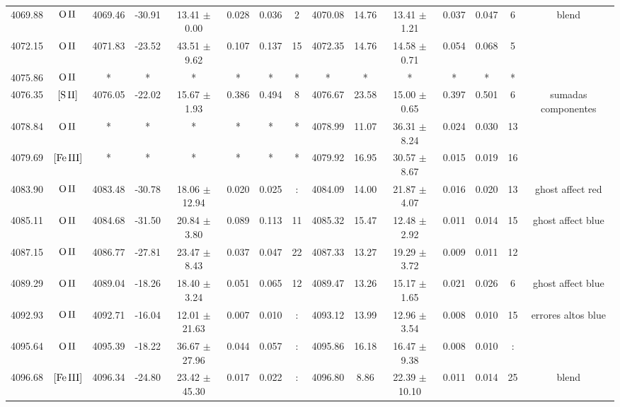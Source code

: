 \documentclass{article}
\begin{document}
\begin{table*}
\begin{adjustbox}{width=\textwidth}
\begin{tabular}{ccccccccccccccc}
4069.88 & $\mbox{O}\thinspace \mbox{II}$ & 4069.46 & -30.91 & 13.41 $\pm$ 0.00 & 0.028 & 0.036 & 2 & 4070.08 & 14.76 & 13.41 $\pm$ 1.21 & 0.037 & 0.047 & 6 &  blend \\
4072.15 & $\mbox{O}\thinspace \mbox{II}$ & 4071.83 & -23.52 & 43.51 $\pm$ 9.62 & 0.107 & 0.137 & 15 & 4072.35 & 14.76 & 14.58 $\pm$ 0.71 & 0.054 & 0.068 & 5 &  \\
4075.86 & $\mbox{O}\thinspace \mbox{II}$ & * & * & * & * & * & * & * & * & * & * & * & * &  \\
4076.35 & $\mbox{[S}\thinspace \mbox{II]}$ & 4076.05 & -22.02 & 15.67 $\pm$ 1.93 & 0.386 & 0.494 & 8 & 4076.67 & 23.58 & 15.00 $\pm$ 0.65 & 0.397 & 0.501 & 6 &  sumadas componentes \\
4078.84 & $\mbox{O}\thinspace \mbox{II}$ & * & * & * & * & * & * & 4078.99 & 11.07 & 36.31 $\pm$ 8.24 & 0.024 & 0.030 & 13 &  \\
4079.69 & $\mbox{[Fe}\thinspace \mbox{III]}$ & * & * & * & * & * & * & 4079.92 & 16.95 & 30.57 $\pm$ 8.67 & 0.015 & 0.019 & 16 &  \\
4083.90 & $\mbox{O}\thinspace \mbox{II}$ & 4083.48 & -30.78 & 18.06 $\pm$ 12.94 & 0.020 & 0.025 & : & 4084.09 & 14.00 & 21.87 $\pm$ 4.07 & 0.016 & 0.020 & 13 &  ghost affect red \\
4085.11 & $\mbox{O}\thinspace \mbox{II}$ & 4084.68 & -31.50 & 20.84 $\pm$ 3.80 & 0.089 & 0.113 & 11 & 4085.32 & 15.47 & 12.48 $\pm$ 2.92 & 0.011 & 0.014 & 15 &  ghost affect blue \\
4087.15 & $\mbox{O}\thinspace \mbox{II}$ & 4086.77 & -27.81 & 23.47 $\pm$ 8.43 & 0.037 & 0.047 & 22 & 4087.33 & 13.27 & 19.29 $\pm$ 3.72 & 0.009 & 0.011 & 12 &  \\
4089.29 & $\mbox{O}\thinspace \mbox{II}$ & 4089.04 & -18.26 & 18.40 $\pm$ 3.24 & 0.051 & 0.065 & 12 & 4089.47 & 13.26 & 15.17 $\pm$ 1.65 & 0.021 & 0.026 & 6 &  ghost affect blue \\
4092.93 & $\mbox{O}\thinspace \mbox{II}$ & 4092.71 & -16.04 & 12.01 $\pm$ 21.63 & 0.007 & 0.010 & : & 4093.12 & 13.99 & 12.96 $\pm$ 3.54 & 0.008 & 0.010 & 15 &  errores altos blue \\
4095.64 & $\mbox{O}\thinspace \mbox{II}$ & 4095.39 & -18.22 & 36.67 $\pm$ 27.96 & 0.044 & 0.057 & : & 4095.86 & 16.18 & 16.47 $\pm$ 9.38 & 0.008 & 0.010 & : &  \\
4096.68 & $\mbox{[Fe}\thinspace \mbox{III]}$ & 4096.34 & -24.80 & 23.42 $\pm$ 45.30 & 0.017 & 0.022 & : & 4096.80 & 8.86 & 22.39 $\pm$ 10.10 & 0.011 & 0.014 & 25 &  blend \\

\end{tabular}
\end{adjustbox}
\end{table*}
\end{document}
